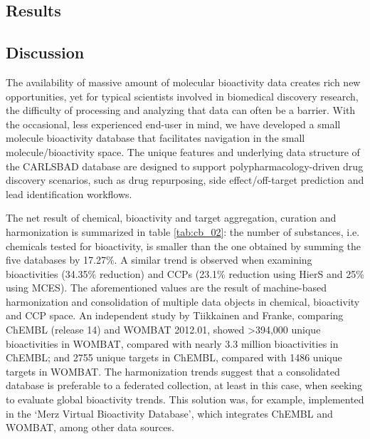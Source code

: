 \subsection{Results}

\subsection{Discussion}

The availability of massive amount of molecular bioactivity data creates rich new opportunities, yet for typical scientists involved in biomedical discovery research, the difficulty of processing and analyzing that data can often be a barrier. With the occasional, less experienced end-user in mind, we have developed a small molecule bioactivity database that facilitates navigation in the small molecule/bioactivity space. The unique features and underlying data structure of the CARLSBAD database are designed to support polypharmacology-driven drug discovery scenarios, such as drug repurposing, side effect/off-target prediction and lead identification workflows.

The net result of chemical, bioactivity and target aggregation, curation and harmonization is summarized in table \ref{tab:cb_02}: the number of substances, i.e. chemicals tested for bioactivity, is smaller than the one obtained by summing the five databases by 17.27\%. A similar trend is observed when examining bioactivities (34.35\% reduction) and CCPs (23.1\% reduction using HierS and 25\% using MCES). The aforementioned values are the result of machine-based harmonization and consolidation of multiple data objects in chemical, bioactivity and CCP space. An independent study by Tiikkainen and Franke\cite{Tiikkainen2013-md,UniProt_Consortium2018-kq}, comparing ChEMBL (release 14) and WOMBAT 2012.01, showed \textgreater 394,000 unique bioactivities in WOMBAT, compared with nearly 3.3 million bioactivities in ChEMBL; and 2755 unique targets in ChEMBL, compared with 1486 unique targets in WOMBAT. The harmonization trends suggest that a consolidated database is preferable to a federated collection, at least in this case, when seeking to evaluate global bioactivity trends. This solution was, for example, implemented in the ‘Merz Virtual Bioactivity Database’, which integrates ChEMBL and WOMBAT, among other data sources.

